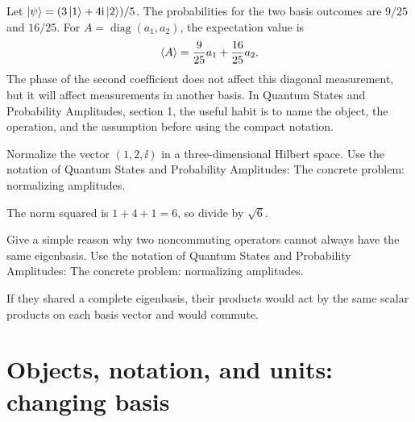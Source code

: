 \begin{example}
Let \(\left|\psi\right\rangle=(3\left|1\right\rangle+4\mathrm i\left|2\right\rangle)/5\).  The probabilities for the two basis outcomes are \(9/25\) and \(16/25\).  For \(A=\operatorname{diag}(a_1,a_2)\), the expectation value is
\[
  \left\langle A\right\rangle=\frac{9}{25}a_1+\frac{16}{25}a_2.
\]
The phase of the second coefficient does not affect this diagonal measurement, but it will affect measurements in another basis.  In Quantum States and Probability Amplitudes, section 1, the useful habit is to name the object, the operation, and the assumption before using the compact notation.
\end{example}



\begin{exercise}
Normalize the vector \((1,2,\ii)\) in a three-dimensional Hilbert space.  Use the notation of Quantum States and Probability Amplitudes: The concrete problem: normalizing amplitudes.
\begin{answer}
The norm squared is \(1+4+1=6\), so divide by \(\sqrt6\).
\end{answer}
\end{exercise}

\begin{exercise}
Give a simple reason why two noncommuting operators cannot always have the same eigenbasis.  Use the notation of Quantum States and Probability Amplitudes: The concrete problem: normalizing amplitudes.
\begin{answer}
If they shared a complete eigenbasis, their products would act by the same scalar products on each basis vector and would commute.
\end{answer}
\end{exercise}



\section{Objects, notation, and units: changing basis}













